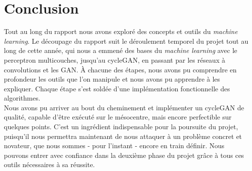 \chapter*{Conclusion}


Tout au long du rapport nous avons exploré des concepts et outils du \textit{machine learning}. Le découpage du rapport suit le déroulement temporel du projet tout au long de cette année, qui nous a emmené des bases du \textit{machine learning} avec le perceptron multicouches, jusqu’au cycleGAN, en passant par les réseaux à convolutions et les GAN. À chacune des étapes, nous avons pu comprendre en profondeur les outils que l'on manipule et nous avons pu apprendre à les expliquer. Chaque étape s'est soldée d'une implémentation fonctionnelle des algorithmes.\\
Nous avons pu arriver au bout du cheminement et implémenter un cycleGAN de qualité, capable d'être exécuté sur le mésocentre, mais encore perfectible sur quelques points. C'est un ingrédient indispensable pour la poursuite du projet, puisqu’il nous permettra maintenant de nous attaquer à un problème concret et novateur, que nous sommes - pour l'instant - encore en train définir. Nous pouvons entrer avec confiance dans la deuxième phase du projet grâce à tous ces outils nécessaires à sa réussite.